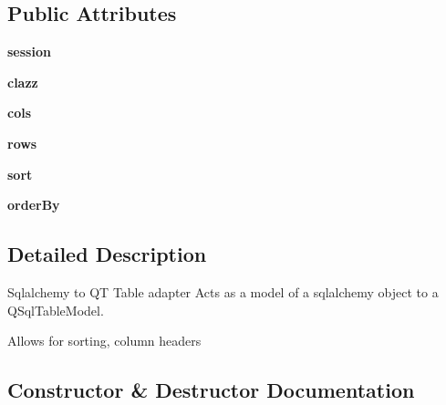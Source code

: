 \subsection*{Public Attributes}
\begin{DoxyCompactItemize}
\item 
\mbox{\label{classgui_1_1sqlalchemy__model_1_1_sqlalchemy_model_a7f46823a5bde7a152ed0f51b8d0d1283}} 
{\bfseries session}
\item 
\mbox{\label{classgui_1_1sqlalchemy__model_1_1_sqlalchemy_model_ab9b693106d3ff1e8604f47f82887309d}} 
{\bfseries clazz}
\item 
\mbox{\label{classgui_1_1sqlalchemy__model_1_1_sqlalchemy_model_ab4e70d8d76de10314579842e9a962c61}} 
{\bfseries cols}
\item 
\mbox{\label{classgui_1_1sqlalchemy__model_1_1_sqlalchemy_model_ab3a96d7f4bd940b33039ba999e84f946}} 
{\bfseries rows}
\item 
\mbox{\label{classgui_1_1sqlalchemy__model_1_1_sqlalchemy_model_a068ee45ea43da0da98b2cef465ab003c}} 
{\bfseries sort}
\item 
\mbox{\label{classgui_1_1sqlalchemy__model_1_1_sqlalchemy_model_aaed54e9d2cc0e9709f71169c06c24385}} 
{\bfseries order\+By}
\end{DoxyCompactItemize}


\subsection{Detailed Description}
Sqlalchemy to QT Table adapter Acts as a model of a sqlalchemy object to a Q\+Sql\+Table\+Model. 

Allows for sorting, column headers 

\subsection{Constructor \& Destructor Documentation}
\mbox{\label{classgui_1_1sqlalchemy__model_1_1_sqlalchemy_model_a9ffd76f7412b24c134321f25ce79f8d6}} 
